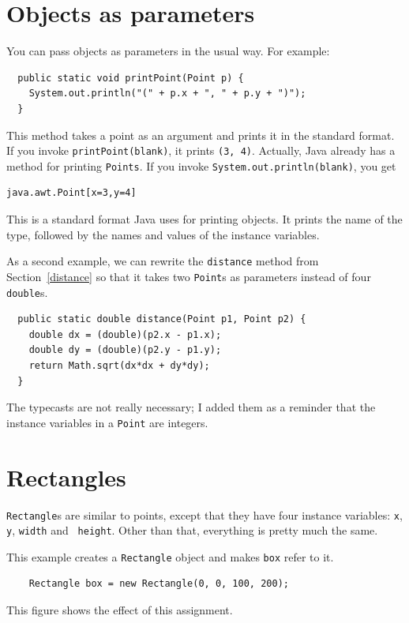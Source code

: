\documentclass[12pt]{book}
\theoremstyle{exercise}
\begin{document}
\section{Objects as parameters}

You can pass objects as parameters in the usual way.  For
example:

\begin{lstlisting}
  public static void printPoint(Point p) {
    System.out.println("(" + p.x + ", " + p.y + ")");
  }
\end{lstlisting}
%
This method takes a point as an argument and prints it in
the standard format.  If you invoke {\tt printPoint(blank)},
it prints {\tt(3, 4)}.  Actually, Java already has a
method for printing {\tt Points}.  If you invoke
{\tt System.out.println(blank)}, you get

\begin{lstlisting}
java.awt.Point[x=3,y=4]
\end{lstlisting}
%
This is a standard format Java uses for printing objects.  It prints
the name of the type, followed by the names and values of the instance
variables.

As a second example, we can rewrite the {\tt distance} method from
Section~\ref{distance} so that it takes two {\tt Point}s as parameters
instead of four {\tt double}s.

\begin{lstlisting}
  public static double distance(Point p1, Point p2) {
    double dx = (double)(p2.x - p1.x);
    double dy = (double)(p2.y - p1.y);
    return Math.sqrt(dx*dx + dy*dy);
  }
\end{lstlisting}
%
The typecasts are not really necessary; I added them as a
reminder that the instance variables in a {\tt Point} are integers.


\section{Rectangles}

{\tt Rectangle}s are similar to points, except that they have four
instance variables: {\tt x}, {\tt y}, {\tt width} and {\tt
height}.  Other than that, everything is pretty much the same.

This example
creates a {\tt Rectangle} object and makes {\tt box} refer to it.

\begin{lstlisting}
    Rectangle box = new Rectangle(0, 0, 100, 200);
\end{lstlisting}
%
This figure shows the effect of this assignment.
\end{document}
